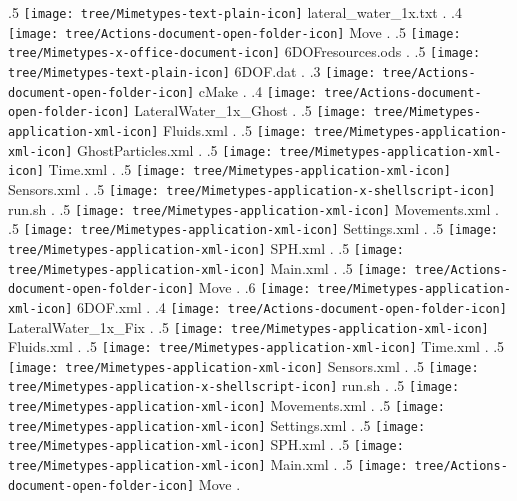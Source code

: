 {.5 { \texttt{[image: tree/Mimetypes-text-plain-icon]} lateral\_water\_1x.txt }.
.4 { \texttt{[image: tree/Actions-document-open-folder-icon]} Move }.
.5 { \texttt{[image: tree/Mimetypes-x-office-document-icon]} 6DOFresources.ods }.
.5 { \texttt{[image: tree/Mimetypes-text-plain-icon]} 6DOF.dat }.
.3 { \texttt{[image: tree/Actions-document-open-folder-icon]} cMake }.
.4 { \texttt{[image: tree/Actions-document-open-folder-icon]} LateralWater\_1x\_Ghost }.
.5 { \texttt{[image: tree/Mimetypes-application-xml-icon]} Fluids.xml }.
.5 { \texttt{[image: tree/Mimetypes-application-xml-icon]} GhostParticles.xml }.
.5 { \texttt{[image: tree/Mimetypes-application-xml-icon]} Time.xml }.
.5 { \texttt{[image: tree/Mimetypes-application-xml-icon]} Sensors.xml }.
.5 { \texttt{[image: tree/Mimetypes-application-x-shellscript-icon]} run.sh }.
.5 { \texttt{[image: tree/Mimetypes-application-xml-icon]} Movements.xml }.
.5 { \texttt{[image: tree/Mimetypes-application-xml-icon]} Settings.xml }.
.5 { \texttt{[image: tree/Mimetypes-application-xml-icon]} SPH.xml }.
.5 { \texttt{[image: tree/Mimetypes-application-xml-icon]} Main.xml }.
.5 { \texttt{[image: tree/Actions-document-open-folder-icon]} Move }.
.6 { \texttt{[image: tree/Mimetypes-application-xml-icon]} 6DOF.xml }.
.4 { \texttt{[image: tree/Actions-document-open-folder-icon]} LateralWater\_1x\_Fix }.
.5 { \texttt{[image: tree/Mimetypes-application-xml-icon]} Fluids.xml }.
.5 { \texttt{[image: tree/Mimetypes-application-xml-icon]} Time.xml }.
.5 { \texttt{[image: tree/Mimetypes-application-xml-icon]} Sensors.xml }.
.5 { \texttt{[image: tree/Mimetypes-application-x-shellscript-icon]} run.sh }.
.5 { \texttt{[image: tree/Mimetypes-application-xml-icon]} Movements.xml }.
.5 { \texttt{[image: tree/Mimetypes-application-xml-icon]} Settings.xml }.
.5 { \texttt{[image: tree/Mimetypes-application-xml-icon]} SPH.xml }.
.5 { \texttt{[image: tree/Mimetypes-application-xml-icon]} Main.xml }.
.5 { \texttt{[image: tree/Actions-document-open-folder-icon]} Move }.
}
